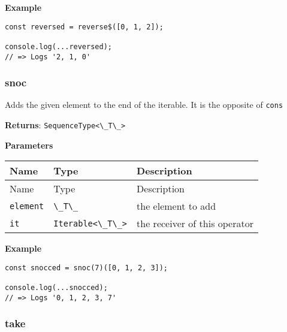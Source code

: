 \textbf{Example}

\begin{lstlisting}[label=166e8d11-881b-4158-8801-cc8314501b92]
const reversed = reverse$([0, 1, 2]);
                                   
console.log(...reversed);
// => Logs '2, 1, 0'
\end{lstlisting}

\hypertarget{2a8b7db1-3dc9-494e-9b73-5921e8508471}{%
\subsubsection{snoc}\label{2a8b7db1-3dc9-494e-9b73-5921e8508471}}

Adds the given element to the end of the iterable. It is the opposite of
\passthrough{\lstinline!cons!}

\textbf{Returns}: \passthrough{\lstinline!SequenceType<\_T\_>!}

\textbf{Parameters}

\begin{longtable}[]{
  >{\raggedright\arraybackslash}p{}
  >{\raggedright\arraybackslash}p{}
  >{\raggedright\arraybackslash}p{}@{}}

\toprule\noalign{}
Name & Type & Description \\
\midrule\noalign{}
\endfirsthead
\toprule\noalign{}
Name & Type & Description \\
\midrule\noalign{}
\endhead
\bottomrule\noalign{}
\endlastfoot
\passthrough{\lstinline!element!} & \passthrough{\lstinline!\_T\_!} &
the element to add \\
\passthrough{\lstinline!it!} & \passthrough{\lstinline!Iterable<\_T\_>!}
& the receiver of this operator \\
\end{longtable}

\textbf{Example}

\begin{lstlisting}[label=eca2c8ba-39bb-4044-81c8-996f42643934]
const snocced = snoc(7)([0, 1, 2, 3]);
                                      
console.log(...snocced);
// => Logs '0, 1, 2, 3, 7'
\end{lstlisting}

\hypertarget{78987131-f1a4-443e-89de-8a3d68ccbdbf}{%
\subsubsection{take}\label{78987131-f1a4-443e-89de-8a3d68ccbdbf}}

